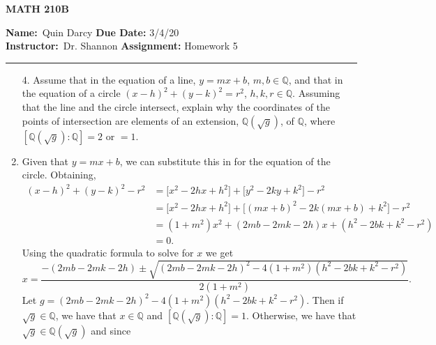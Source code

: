 \documentclass[12pt]{article}
\makeatletter
\theoremstyle{definition}
\theoremstyle{remark}
\newenvironment{solution}[1][\bf{\textit{Solution}}]{\par
  
  \normalfont \topsep6\p@\@plus6\p@\relax
  \list{}{\leftmargin=0mm
          \rightmargin=4mm
          \settowidth{\itemindent}{\itshape#1}%
          \labelwidth=\itemindent
          \parsep=0pt \listparindent=\parindent 
  }
  \item[\hskip\labelsep
        \itshape
    #1\@addpunct{.}]\ignorespaces
}{%
  \popQED\endlist\@endpefalse
}
\makeatother
\begin{document}
\thispagestyle{empty}\hline

\begin{center}
	\vspace{.4cm} {\textbf { \large MATH 210B}}
\end{center}
{\textbf{Name:}\ Quin Darcy \hspace{\fill} \textbf{Due Date:} 3/4/20   \\
{ \textbf{Instructor:}}\ Dr. Shannon \hspace{\fill} \textbf{Assignment:} Homework 5 \\ \hrule}

\justifying

    \begin{enumerate}[leftmargin=*]
        \item[4.] Assume that in the equation of a line, $y=mx+b$, $m,b\in\mathbb{Q}$, and that in the equation of a circle $(x-h)^2+(y-k)^2=r^2$, $h,k,r\in\mathbb{Q}$. Assuming that the line and the circle intersect, explain why the coordinates of the points of intersection are elements of an extension, $\mathbb{Q}(\sqrt{g})$, of $\mathbb{Q}$, where $[\mathbb{Q}(\sqrt{g})\colon\mathbb{Q}]=2$ or $=1$.
            \begin{solution}
                Given that $y=mx+b$, we can substitute this in for the equation of the circle. Obtaining,
                    \begin{equation*}
                        \begin{split}
                            (x-h)^2+(y-k)^2-r^2 &= \big[x^2-2hx+h^2\big]+\big[y^2-2ky+k^2\big]-r^2\\
                            &=\big[x^2-2hx+h^2\big]+\big[(mx+b)^2-2k(mx+b)+k^2\big]-r^2 \\
                            &=(1+m^2)x^2+(2mb-2mk-2h)x+(h^2-2bk+k^2-r^2) \\
                            &= 0.
                        \end{split}
                    \end{equation*}
                Using the quadratic formula to solve for $x$ we get
                    \begin{equation*}
                        x=\frac{-(2mb-2mk-2h)\pm\sqrt{(2mb-2mk-2h)^2-4(1+m^2)(h^2-2bk+k^2-r^2)}}{2(1+m^2)}.
                    \end{equation*}
                 Let $g=(2mb-2mk-2h)^2-4(1+m^2)(h^2-2bk+k^2-r^2)$. Then if $\sqrt{g}\in\mathbb{Q}$, we have that $x\in\mathbb{Q}$ and $[\mathbb{Q}(\sqrt{g})\colon\mathbb{Q}]=1$. Otherwise, we have that $\sqrt{g}\in\mathbb{Q}(\sqrt{g})$ and since 

\end{solution}
\end{enumerate}
\end{document}
